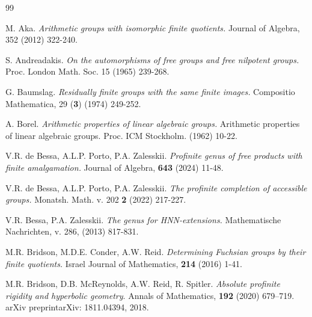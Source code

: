 \documentclass[a4paper,12pt]{article}
\begin{document}
{\nocite{*}

\begin{thebibliography}{99}
%
%


 M. Aka. {\it Arithmetic groups with isomorphic finite quotients.} Journal of Algebra, 352 (2012) 322-240.

 S. Andreadakis. {\it On the automorphisms of free groups and free nilpotent groups.} Proc. London Math. Soc. 15 (1965) 239-268.

 G. Baumslag. {\it Residually finite groups with the same finite images.} Compositio Mathematica, 29 (\textbf{3}) (1974) 249-252.

 A. Borel. \textit{ Arithmetic properties of linear algebraic groups.}
Arithmetic properties of linear algebraic groups.   Proc. ICM Stockholm. (1962) 10-22. 



  V.R. de Bessa, A.L.P. Porto, P.A. Zalesskii. {\it Profinite genus of free products with finite amalgamation.} Journal of Algebra, {\bf 643} (2024) 11-48.

  V.R. de Bessa, A.L.P. Porto, P.A. Zalesskii. {\it The profinite  completion of accessible groups.} Monatsh. Math. v. 202 {\bf 2} (2022) 217-227.

 V.R. Bessa, P.A. Zalesskii. {\it The genus for HNN-extensions.} Mathematische Nachrichten, v. 286, (2013) 817-831.

  M.R. Bridson, M.D.E. Conder, A.W. Reid. {\it Determining Fuchsian groups by their finite quotients.} Israel Journal of Mathematics, \textbf{214} (2016) 1-41.
	
 M.R. Bridson, D.B. McReynolds, A.W. Reid, R. Spitler. \textit{ Absolute profinite rigidity and hyperbolic geometry}. Annals of Mathematics,  {\bf 192} (2020) 679--719. arXiv preprintarXiv:  1811.04394, 2018.
	

\end{thebibliography}}
\end{document}
